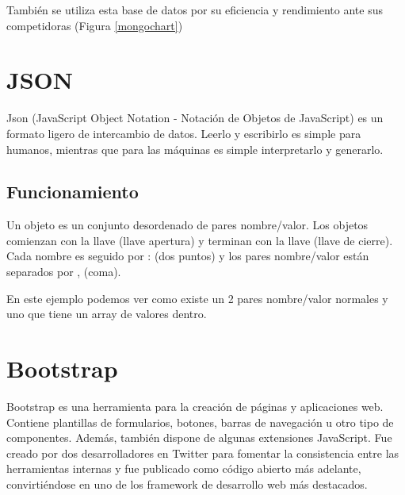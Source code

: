 También se utiliza esta base de datos por su eficiencia y rendimiento\cite{benchmark} ante sus competidoras (Figura \ref{mongochart})\\



\section{JSON}
Json\cite{json} (JavaScript Object Notation - Notación de Objetos de JavaScript) es un formato ligero de intercambio de datos. Leerlo y escribirlo es simple para humanos, mientras que para las máquinas es simple interpretarlo y generarlo.

\subsection{Funcionamiento}
Un objeto es un conjunto desordenado de pares nombre/valor. Los objetos comienzan con la llave { (llave apertura) y terminan con la llave } (llave de cierre). Cada nombre es seguido por : (dos puntos) y los pares nombre/valor están separados por , (coma).


En este ejemplo podemos ver como existe un 2 pares nombre/valor normales y uno que tiene un array de valores dentro.


\section{Bootstrap}
Bootstrap\cite{bootstrap} es una herramienta para la creación de páginas y aplicaciones web. Contiene plantillas de formularios, botones, barras de navegación u otro tipo de componentes. Además, también dispone de algunas extensiones JavaScript. Fue creado por dos desarrolladores en Twitter para fomentar la consistencia entre las herramientas internas y fue publicado como código abierto más adelante, convirtiéndose en uno de los framework de desarrollo web más destacados. \\

